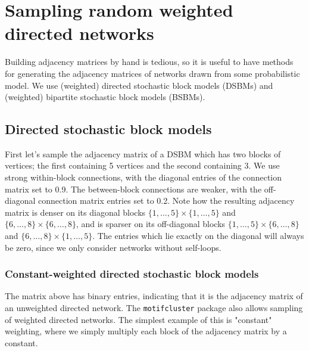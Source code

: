 \documentclass{article}
\begin{document}
\section{Sampling random weighted directed networks}

Building adjacency matrices by hand is tedious,
so it is useful to have methods for generating
the adjacency matrices of networks drawn from some probabilistic model.
We use (weighted) directed stochastic block models (DSBMs) and
(weighted) bipartite stochastic block models (BSBMs).

\subsection{Directed stochastic block models}

First let's sample the adjacency matrix of a DSBM
which has two blocks of vertices;
the first containing 5 vertices and the second containing 3.
We use strong within-block connections,
with the diagonal entries of the connection matrix set to 0.9.
The between-block connections are weaker, with the off-diagonal
connection matrix entries set to 0.2.
Note how the resulting adjacency matrix is denser
on its diagonal blocks
$\{1, \dots, 5\} \times \{1, \dots, 5\}$
and
$\{6, \dots, 8\} \times \{6, \dots, 8\}$,
and is sparser on its off-diagonal blocks
$\{1, \dots, 5\} \times \{6, \dots, 8\}$
and
$\{6, \dots, 8\} \times \{1, \dots, 5\}$.
The entries which lie exactly on the diagonal will
always be zero,
since we only consider networks without self-loops.

\begin{pyconsole}
\end{pyconsole}

\begin{pyconsole}
\end{pyconsole}

\subsubsection{Constant-weighted directed stochastic block models}

The matrix above has binary entries,
indicating that it is the adjacency matrix of an unweighted
directed network.
The \texttt{motifcluster} package also allows sampling of weighted directed networks.
The simplest example of this is "constant" weighting,
where we simply multiply each block of the adjacency matrix by a constant.
\end{document}
